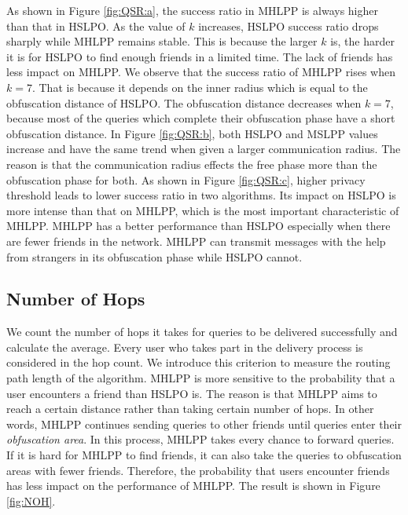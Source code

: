 As shown in Figure \ref{fig:QSR:a}, the success ratio in MHLPP is always higher than that in HSLPO. As the value of $k$ increases, HSLPO success ratio drops sharply while MHLPP remains stable. This is because the larger $k$ is, the harder it is for HSLPO to find enough friends in a limited time. The lack of friends has less impact on MHLPP. We observe that the success ratio of MHLPP rises when $k=7$. That is because it depends on the inner radius which is equal to the obfuscation distance of HSLPO. The obfuscation distance decreases when $k=7$, because most of the queries which complete their obfuscation phase have a short obfuscation distance. In Figure \ref{fig:QSR:b}, both HSLPO and MSLPP values increase and have the same trend when given a larger communication radius. The reason is that the communication radius effects the free phase more than the obfuscation phase for both. As shown in Figure \ref{fig:QSR:c}, higher privacy threshold leads to lower success ratio in two algorithms. Its impact on HSLPO is more intense than that on MHLPP, which is the most important characteristic of MHLPP. MHLPP has a better performance than HSLPO especially when there are fewer friends in the network. MHLPP can transmit messages with the help from strangers in its obfuscation phase while HSLPO cannot. 

\subsection{ Number of Hops}

\noindent We count the number of hops it takes for queries to be delivered successfully and calculate the average. Every user who takes part in the delivery process is considered in the hop count. We introduce this criterion to measure the routing path length of the algorithm. MHLPP is more sensitive to the probability that a user encounters a friend than HSLPO is. The reason is that MHLPP aims to reach a certain distance rather than taking certain number of hops. In other words, MHLPP continues sending queries to other friends until queries enter their \textit{obfuscation area}. In this process, MHLPP takes every chance to forward queries. If it is hard for MHLPP to find friends, it can also take the queries to obfuscation areas with fewer friends. Therefore, the probability that users encounter friends has less impact on the performance of MHLPP. The result is shown in Figure \ref{fig:NOH}.


